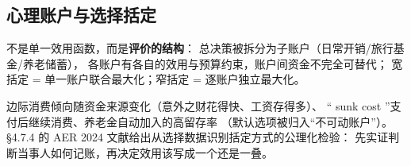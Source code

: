 \subsection{心理账户与选择括定}

不是单一效用函数，而是\textbf{评价的结构}：
总决策被拆分为子账户（日常开销/旅行基金/养老储蓄），
各账户有各自的效用与预算约束，账户间资金不完全可替代；
宽括定 = 单一账户联合最大化；窄括定 = 逐账户独立最大化。

边际消费倾向随资金来源变化（意外之财花得快、工资存得多）、
“ sunk cost ”支付后继续消费、养老金自动加入的高留存率
（默认选项被归入“不可动账户”）。
§4.7.4 的 AER 2024 文献给出从选择数据识别括定方式的公理化检验：
先实证判断当事人如何记账，再决定效用该写成一个还是一叠。
